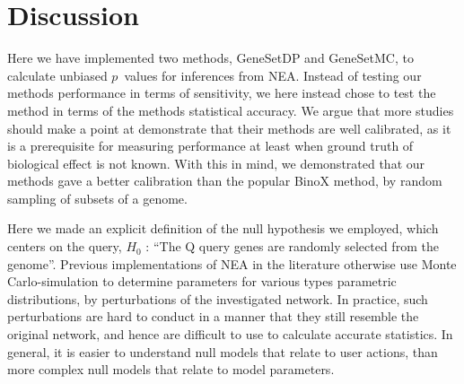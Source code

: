 \documentclass[a4paper,american]{lipics-v2016}
\begin{document}
\section*{Discussion}

Here we have implemented two methods, GeneSetDP and GeneSetMC, to calculate unbiased $p$~values for inferences from NEA.
Instead of testing our methods performance in terms of sensitivity, we here instead chose to test the method in terms of the methods statistical accuracy. We argue that more studies should make a point at demonstrate that their methods are well calibrated, as it is a prerequisite for measuring performance at least when ground truth of biological effect is not known.
With this in mind, we demonstrated that our methods gave a better calibration than the popular BinoX method, by random sampling of subsets of a genome.

Here we made an explicit definition of the null hypothesis we employed, which centers on the query, $H_0$ : ``The Q query genes are randomly selected from the genome''. Previous implementations of NEA in the literature otherwise use Monte Carlo-simulation to determine parameters for various types parametric distributions, by perturbations of the investigated network. In practice, such perturbations are hard to conduct in a manner that they still resemble the original network, and hence are difficult to use to calculate accurate statistics. In general, it is easier to understand null models that relate to user actions, than more complex null models that relate to model parameters.


\end{document}
